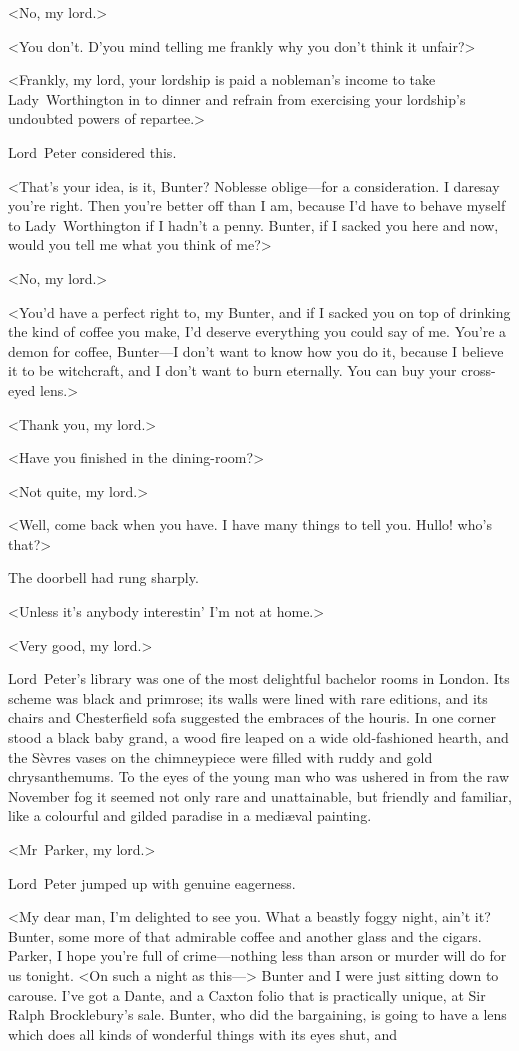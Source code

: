 <No, my lord.>

<You don't. D'you mind telling me frankly why you don't think it unfair?>

<Frankly, my lord, your lordship is paid a nobleman's income to take Lady~Worthington in to dinner and refrain from exercising your lordship's undoubted powers of repartee.>

Lord~Peter considered this.

<That's your idea, is it, Bunter? Noblesse oblige—for a consideration. I daresay you're right. Then you're better off than I am, because I'd have to behave myself to Lady~Worthington if I hadn't a penny. Bunter, if I sacked you here and now, would you tell me what you think of me?>

<No, my lord.>

<You'd have a perfect right to, my Bunter, and if I sacked you on top of drinking the kind of coffee you make, I'd deserve everything you could say of me. You're a demon for coffee, Bunter—I don't want to know how you do it, because I believe it to be witchcraft, and I don't want to burn eternally. You can buy your cross-eyed lens.>

<Thank you, my lord.>

<Have you finished in the dining-room?>

<Not quite, my lord.>

<Well, come back when you have. I have many things to tell you. Hullo! who's that?>

The doorbell had rung sharply.

<Unless it's anybody interestin' I'm not at home.>

<Very good, my lord.>

Lord~Peter's library was one of the most delightful bachelor rooms in London. Its scheme was black and primrose; its walls were lined with rare editions, and its chairs and Chesterfield sofa suggested the embraces of the houris. In one corner stood a black baby grand, a wood fire leaped on a wide old-fashioned hearth, and the Sèvres vases on the chimneypiece were filled with ruddy and gold chrysanthemums. To the eyes of the young man who was ushered in from the raw November fog it seemed not only rare and unattainable, but friendly and familiar, like a colourful and gilded paradise in a mediæval painting.

<Mr~Parker, my lord.>

Lord~Peter jumped up with genuine eagerness.

<My dear man, I'm delighted to see you. What a beastly foggy night, ain't it? Bunter, some more of that admirable coffee and another glass and the cigars. Parker, I hope you're full of crime—nothing less than arson or murder will do for us tonight. <On such a night as this—> Bunter and I were just sitting down to carouse. I've got a Dante, and a Caxton folio that is practically unique, at Sir Ralph Brocklebury's sale. Bunter, who did the bargaining, is going to have a lens which does all kinds of wonderful things with its eyes shut, and

